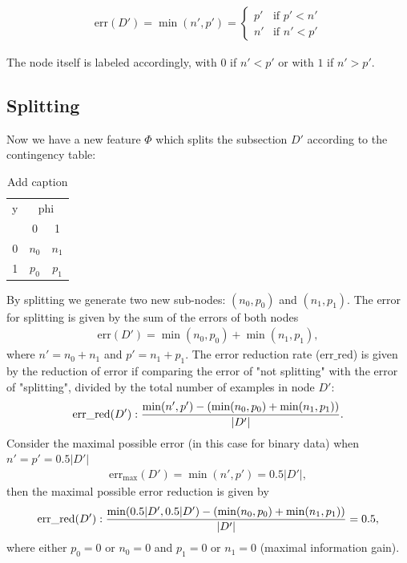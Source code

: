 \documentclass[12pt]{article}
\begin{document}
\begin{align}
	\text{err}(D') = \min(n',p') = 
	\begin{cases}
		p' & \text{if } p'< n' \\
		n' & \text{if } n'< p'
	\end{cases}
\end{align}

The node itself is labeled accordingly, with $0$ if $n'< p'$ or with $1$ if $n'> p'$. 

\subsection{Splitting}

Now we have a new feature $\Phi$ which splits the subsection $D'$ according to the contingency table:
\begin{table}[htbp]
	\centering
	\caption{Add caption}
	\begin{tabular}{|c|c|c|}
		\toprule
		y     & \multicolumn{2}{c|}{phi} \\
		& \multicolumn{1}{c}{0} & 1 \\
		\cmidrule{2-3}    0     & $n_0$    & $n_1$ \\
		\cmidrule{2-3}    1     & $p_0$    & $p_1$ \\
		\bottomrule
	\end{tabular}%
	\label{tab:addlabel}%
\end{table}%
By splitting we generate two new sub-nodes: $(n_0,p_0)$ and $(n_1,p_1)$. The error for splitting is given by the sum of the errors of both nodes
\begin{align}
\text{err}(D') = \min(n_0,p_0) + \min(n_1,p_1),
\end{align}
where $n'=n_0 + n_1$ and $p'=n_1+p_1$. The error reduction rate ($\text{err}\_\text{red}$) is given by the reduction of error if comparing the error of "not splitting" with the error of "splitting", divided by the total number of examples in node $D'$:
\begin{align}
\text{\text{err}\_\text{red}}(D'): \frac{\min(n',p')-\left(\min(n_0,p_0) + \min(n_1,p_1)\right)}{\lvert D' \rvert}.
\end{align} 
Consider the maximal possible error (in this case for binary data) when $n'=p'=0.5 \lvert D' \rvert$
\begin{align}
\text{err}_\text{max}(D')=\min(n',p')=0.5\lvert D' \rvert,
\end{align}
then the maximal possible error reduction is given by 
\begin{align}
\text{\text{err}\_\text{red}}(D'): \frac{\min(0.5 \lvert D',0.5 \lvert D')-\left(\min(n_0,p_0) + \min(n_1,p_1)\right)}{\lvert D' \rvert} = 0.5,
\end{align}
where either $p_0=0$ or $n_0=0$ and $p_1=0$ or $n_1=0$ (maximal information gain).
\end{document}
